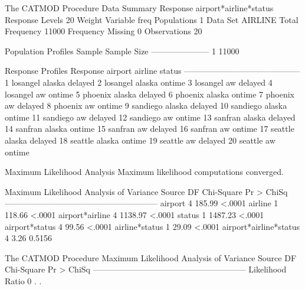 \documentclass{article}
\begin{document}
\begin{Woutput}
The CATMOD Procedure
                            Data Summary
Response           airport*airline*status     Response Levels     20
Weight Variable    freq                       Populations          1
Data Set           AIRLINE                    Total Frequency  11000
Frequency Missing  0                          Observations        20

 Population Profiles
Sample    Sample Size
---------------------
    1           11000

            Response Profiles
Response    airport     airline    status
------------------------------------------
    1       losangel    alaska     delayed
    2       losangel    alaska     ontime
    3       losangel    aw         delayed
    4       losangel    aw         ontime
    5       phoenix     alaska     delayed
    6       phoenix     alaska     ontime
    7       phoenix     aw         delayed
    8       phoenix     aw         ontime
    9       sandiego    alaska     delayed
   10       sandiego    alaska     ontime
   11       sandiego    aw         delayed
   12       sandiego    aw         ontime
   13       sanfran     alaska     delayed
   14       sanfran     alaska     ontime
   15       sanfran     aw         delayed
   16       sanfran     aw         ontime
   17       seattle     alaska     delayed
   18       seattle     alaska     ontime
   19       seattle     aw         delayed
   20       seattle     aw         ontime

                   Maximum Likelihood Analysis
           Maximum likelihood computations converged.

        Maximum Likelihood Analysis of Variance
Source                     DF   Chi-Square    Pr > ChiSq
--------------------------------------------------------
airport                     4       185.99        <.0001
airline                     1       118.66        <.0001
airport*airline             4      1138.97        <.0001
status                      1      1487.23        <.0001
airport*status              4        99.56        <.0001
airline*status              1        29.09        <.0001
airport*airline*status      4         3.26        0.5156

The CATMOD Procedure
        Maximum Likelihood Analysis of Variance
Source                     DF   Chi-Square    Pr > ChiSq
--------------------------------------------------------
Likelihood Ratio            0          .           .


\end{Woutput}
\end{document}

